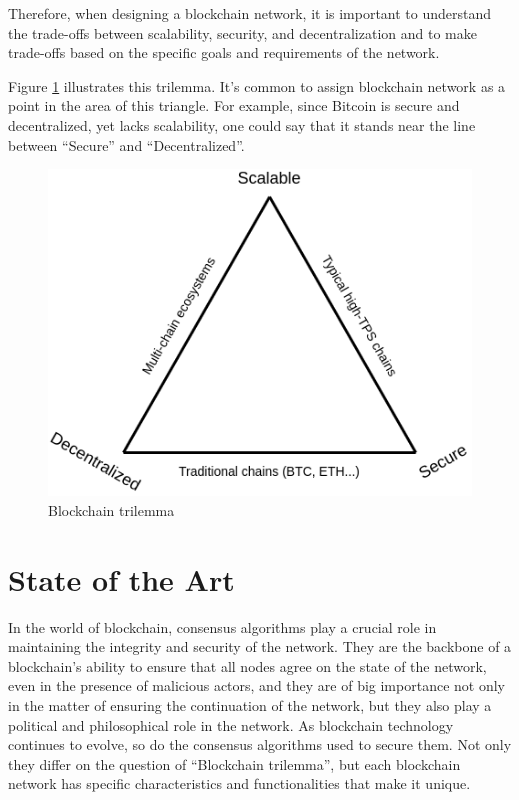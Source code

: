 Therefore, when designing a blockchain network, it is important to understand the trade-offs between scalability, security, and decentralization and to make trade-offs based on the specific goals and requirements of the network.

Figure \ref{fig:trilemma} illustrates this trilemma. It's common to assign blockchain network as a point in the area of this triangle. For example, since Bitcoin is secure and decentralized, yet lacks scalability, one could say that it stands near the line between ``Secure'' and ``Decentralized''.

\begin{figure}[H]
    \centering
    \includegraphics[width=\textwidth/2,keepaspectratio]{imagens/trilemma.png}
    \caption{Blockchain trilemma}
    \label{fig:trilemma}

\end{figure}



\section{State of the Art}
\label{stateoftheart}

In the world of blockchain, consensus algorithms play a crucial role in maintaining the integrity and security of the network. They are the backbone of a blockchain's ability to ensure that all nodes agree on the state of the network, even in the presence of malicious actors, and they are of big importance not only in the matter of ensuring the continuation of the network, but they also play a political and philosophical role in the network.
As blockchain technology continues to evolve, so do the consensus algorithms used to secure them.
Not only they differ on the question of ``Blockchain trilemma'', but each blockchain network has specific characteristics and functionalities that make it unique.

